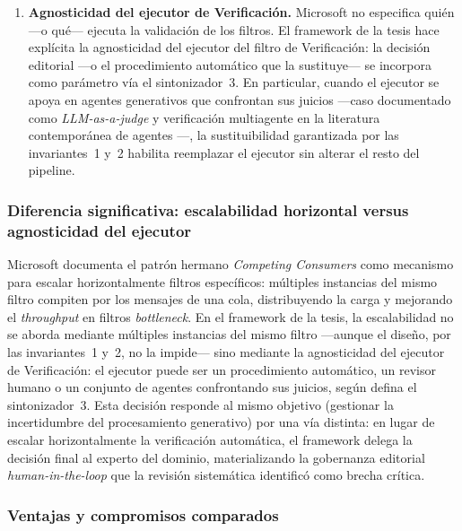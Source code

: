 \begin{enumerate}
  \item \textbf{Agnosticidad del ejecutor de Verificación.}
        Microsoft no especifica quién ---o qué--- ejecuta la validación de
        los filtros. El framework de la tesis hace explícita la agnosticidad
        del ejecutor del filtro de Verificación: la decisión editorial ---o
        el procedimiento automático que la sustituye--- se incorpora como
        parámetro vía el sintonizador~3. En particular, cuando el ejecutor
        se apoya en agentes generativos que confrontan sus juicios ---caso
        documentado como \textit{LLM-as-a-judge} y verificación multiagente
        en la literatura contemporánea de agentes
        \citep{xi:2023}---, la sustituibilidad garantizada por las
        invariantes~1 y~2 habilita reemplazar el ejecutor sin alterar el
        resto del pipeline.
\end{enumerate}

\subsubsection{Diferencia significativa: escalabilidad horizontal versus agnosticidad del ejecutor}

Microsoft documenta el patrón hermano \textit{Competing Consumers}
\citep{microsoft-azure:2024} como mecanismo para escalar horizontalmente
filtros específicos: múltiples instancias del mismo filtro compiten por
los mensajes de una cola, distribuyendo la carga y mejorando el
\textit{throughput} en filtros \textit{bottleneck}. En el framework de la
tesis, la escalabilidad no se aborda mediante múltiples instancias del
mismo filtro ---aunque el diseño, por las invariantes~1 y~2, no la impide---
sino mediante la agnosticidad del ejecutor de Verificación: el ejecutor
puede ser un procedimiento automático, un revisor humano o un conjunto de
agentes confrontando sus juicios, según defina el sintonizador~3. Esta
decisión responde al mismo objetivo (gestionar la incertidumbre del
procesamiento generativo) por una vía distinta: en lugar de escalar
horizontalmente la verificación automática, el framework delega la decisión
final al experto del dominio, materializando la gobernanza editorial
\textit{human-in-the-loop} que la revisión sistemática identificó como
brecha crítica.

\subsubsection{Ventajas y compromisos comparados}

